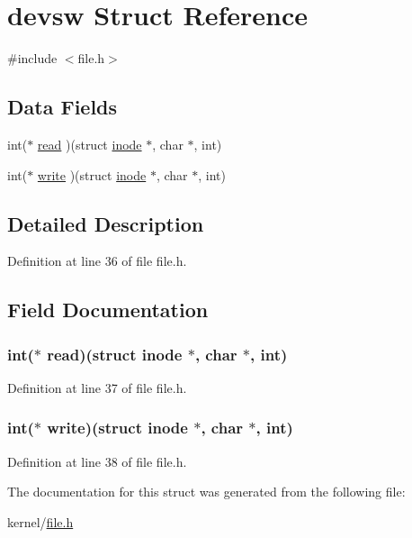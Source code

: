 \hypertarget{structdevsw}{\section{devsw Struct Reference}
\label{structdevsw}
}


{\ttfamily \#include $<$file.\-h$>$}

\subsection*{Data Fields}
\begin{DoxyCompactItemize}
\item 
int($\ast$ \hyperlink{structdevsw_aeeb08255a820a8e765b8065df04ba30e}{read} )(struct \hyperlink{structinode}{inode} $\ast$, char $\ast$, int)
\item 
int($\ast$ \hyperlink{structdevsw_a0239cf9da2d2be6d1d7e99446b7fc6ba}{write} )(struct \hyperlink{structinode}{inode} $\ast$, char $\ast$, int)
\end{DoxyCompactItemize}


\subsection{Detailed Description}


Definition at line 36 of file file.\-h.



\subsection{Field Documentation}
\hypertarget{structdevsw_aeeb08255a820a8e765b8065df04ba30e}{
\subsubsection[{read}]{\setlength{\rightskip}{0pt plus 5cm}int($\ast$ read)(struct {\bf inode} $\ast$, char $\ast$, int)}}\label{structdevsw_aeeb08255a820a8e765b8065df04ba30e}


Definition at line 37 of file file.\-h.

\hypertarget{structdevsw_a0239cf9da2d2be6d1d7e99446b7fc6ba}{
\subsubsection[{write}]{\setlength{\rightskip}{0pt plus 5cm}int($\ast$ write)(struct {\bf inode} $\ast$, char $\ast$, int)}}\label{structdevsw_a0239cf9da2d2be6d1d7e99446b7fc6ba}


Definition at line 38 of file file.\-h.



The documentation for this struct was generated from the following file\-:\begin{DoxyCompactItemize}
\item 
kernel/\hyperlink{file_8h}{file.\-h}\end{DoxyCompactItemize}
